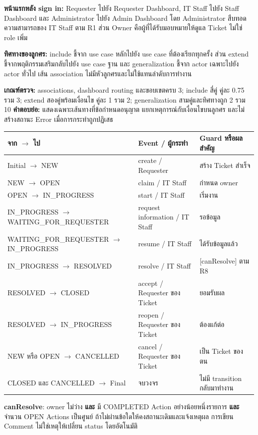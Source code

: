 \textbf{หน้าแรกหลัง sign in:} Requester ไปยัง Requester Dashboard, IT Staff ไปยัง Staff Dashboard และ Administrator ไปยัง Admin Dashboard โดย Administrator สืบทอดความสามารถของ IT Staff ตาม R1 ส่วน Owner คือผู้ที่ได้รับมอบหมายให้ดูแล Ticket ไม่ใช่ role เพิ่ม\par
\textbf{ทิศทางของลูกศร:} include ชี้จาก use case หลักไปยัง use case ที่ต้องเรียกทุกครั้ง ส่วน extend ชี้จากพฤติกรรมเสริมกลับไปยัง use case ฐาน และ generalization ชี้จาก actor เฉพาะไปยัง actor ทั่วไป เส้น association ไม่มีหัวลูกศรและไม่ใช้แทนลำดับการทำงาน\par
\textbf{เกณฑ์ตรวจ:} associations, dashboard routing และขอบเขตครบ 3; include สี่คู่ คู่ละ 0.75 รวม 3; extend สองคู่พร้อมเงื่อนไข คู่ละ 1 รวม 2; generalization สามคู่และทิศทางถูก 2 รวม 10
\newpage
{}
\textbf{คำตอบย่อ:} แสดงเฉพาะเส้นทางที่ข้อกำหนดอนุญาต แยกเหตุการณ์กับเงื่อนไขบนลูกศร และไม่สร้างสถานะ Error เมื่อการกระทำถูกปฏิเสธ
\begin{tabularx}{\linewidth}{|p{4.5cm}|Y|p{3.3cm}|}\hline
จาก $\rightarrow$ ไป & Event / ผู้กระทำ & Guard หรือผลสำคัญ\\\hline
Initial $\rightarrow$ NEW & create / Requester & สร้าง Ticket สำเร็จ\\\hline
NEW $\rightarrow$ OPEN & claim / IT Staff & กำหนด owner\\\hline
OPEN $\rightarrow$ IN\_PROGRESS & start / IT Staff & เริ่มงาน\\\hline
IN\_PROGRESS $\rightarrow$ WAITING\_FOR\_REQUESTER & request information / IT Staff & รอข้อมูล\\\hline
WAITING\_FOR\_REQUESTER $\rightarrow$ IN\_PROGRESS & resume / IT Staff & ได้รับข้อมูลแล้ว\\\hline
IN\_PROGRESS $\rightarrow$ RESOLVED & resolve / IT Staff & [canResolve] ตาม R8\\\hline
RESOLVED $\rightarrow$ CLOSED & accept / Requester ของ Ticket & ยอมรับผล\\\hline
RESOLVED $\rightarrow$ IN\_PROGRESS & reopen / Requester ของ Ticket & ต้องแก้ต่อ\\\hline
NEW หรือ OPEN $\rightarrow$ CANCELLED & cancel / Requester ของ Ticket & เป็น Ticket ของตน\\\hline
CLOSED และ CANCELLED $\rightarrow$ Final & จบวงจร & ไม่มี transition กลับมาทำงาน\\\hline
\end{tabularx}
\textbf{canResolve}: owner ไม่ว่าง \textbf{และ} มี COMPLETED Action อย่างน้อยหนึ่งรายการ \textbf{และ} จำนวน OPEN Actions เป็นศูนย์ ถ้าไม่ผ่านข้อใดให้คงสถานะเดิมและแจ้งเหตุผล การเขียน Comment ไม่ใช่เหตุให้เปลี่ยน status โดยอัตโนมัติ\par
